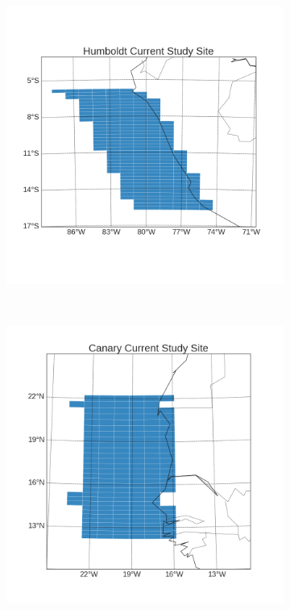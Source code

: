 \documentclass[12pt]{article}
\begin{document}
\begin{figure}[!h]
\begin{subfigure}[b]{0.4\textwidth}
        \includegraphics[width=\linewidth]{../../figs/humcs/study-site/humboldt-current-study-site.png}
    \end{subfigure} \\
    \begin{subfigure}[b]{0.4\textwidth}
        \centering
        \includegraphics[width=\linewidth]{../../figs/cancs/study-site/canary-current-study-site.png}

\end{subfigure}
\end{figure}
\end{document}
